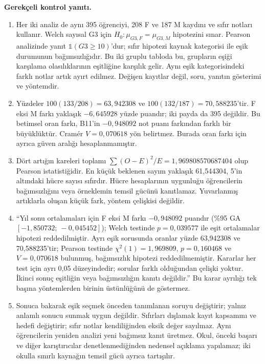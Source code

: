\textbf{Gerekçeli kontrol yanıtı.}
\begin{enumerate}
  \item Her iki analiz de aynı 395 öğrenciyi, 208 F ve 187 M kaydını
  ve sıfır notları kullanır. Welch sayısal G3 için
  $H_0:\mu_{G3,F}=\mu_{G3,M}$ hipotezini sınar. Pearson analizinde
  yanıt $\mathbb{1}(G3\geq10)$'dur; sıfır hipotezi kaynak kategorisi
  ile eşik durumunun bağımsızlığıdır. Bu iki gruplu tabloda bu,
  grupların eşiği karşılama olasılıklarının eşitliğine karşılık gelir.
  Aynı eşik kategorisindeki farklı notlar artık ayırt edilmez.
  Değişen kayıtlar değil, soru, yanıtın gösterimi ve yöntemdir.
  \item Yüzdeler $100(133/208)=63{,}942308$ ve
  $100(132/187)=70{,}588235$'tir. F eksi M farkı yaklaşık
  $-6{,}645928$ yüzde puandır; iki payda da 395 değildir.
  Bu betimsel oran farkı, B11'in $-0{,}948092$ not puanı farkından
  farklı bir büyüklüktür. Cramér $V=0{,}070618$ yön belirtmez.
  Burada oran farkı için ayrıca güven aralığı hesaplanmamıştır.
  \item Dört artığın kareleri toplamı
  $\sum (O-E)^2/E=1{,}969808570687404$ olup Pearson istatistiğidir.
  En küçük beklenen sayım yaklaşık 61,544304, 5'in altındaki hücre
  sayısı sıfırdır. Hücre hesaplarının uygunluğu öğrencilerin
  bağımsızlığını veya örneklemin temsil gücünü kanıtlamaz.
  Yuvarlanmış artıklarla oluşan küçük fark, yöntem çelişkisi değildir.
  \item ``Yıl sonu ortalamaları için F eksi M farkı
  $-0{,}948092$ puandır (\%95 GA
  $[-1{,}850732;\ -0{,}045452]$); Welch testinde
  $p=0{,}039577$ ile eşit ortalamalar hipotezi reddedilmiştir.
  Ayrı eşik sorusunda oranlar yüzde 63,942308 ve 70,588235'tir;
  Pearson testinde $\chi^2(1)=1{,}969809$, $p=0{,}160468$ ve
  $V=0{,}070618$ bulunmuş, bağımsızlık hipotezi reddedilmemiştir.
  Kararlar her test için ayrı 0,05 düzeyindedir; sorular farklı
  olduğundan çelişki yoktur. İkinci sonuç eşitliğin veya bağımsızlığın
  kanıtı değildir.'' Bu karar ayrılığı tek başına yöntemlerden
  birinin üstünlüğünü de göstermez.
  \item Sonuca bakarak eşik seçmek önceden tanımlanan soruyu
  değiştirir; yalnız anlamlı sonucu sunmak uygun değildir.
  Sıfırları dışlamak kayıt kapsamını ve hedefi değiştirir; sıfır
  notlar kendiliğinden eksik değer sayılmaz. Aynı öğrencilerin
  yeniden analizi yeni bağımsız kanıt üretmez. Okul, önceki başarı
  ve diğer karıştırıcılar denetlenmediğinden nedensel açıklama
  yapılamaz; iki okulla sınırlı kaynağın temsil gücü ayrıca tartışılır.
\end{enumerate}

